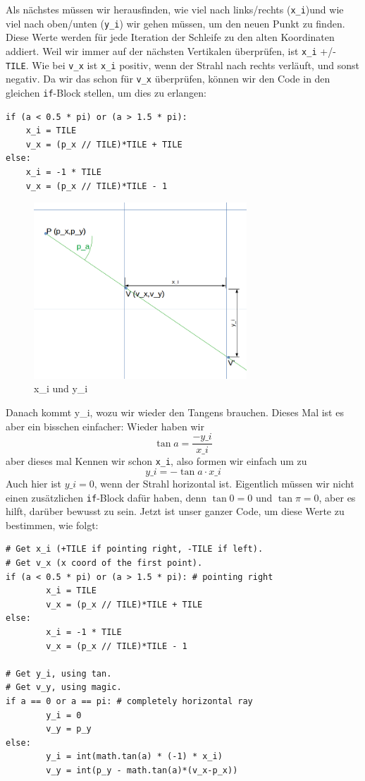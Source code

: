 \documentclass[a4paper,12pt]{report}
\begin{document}
Als nächstes müssen wir herausfinden, wie viel nach links/rechts (\texttt{x\_i})und wie viel nach oben/unten (\texttt{y\_i}) wir gehen müssen, um den neuen Punkt zu finden. Diese Werte werden für jede Iteration der Schleife zu den alten Koordinaten addiert. Weil wir immer auf der nächsten Vertikalen überprüfen, ist \texttt{x\_i} +/- \texttt{TILE}. Wie bei \texttt{v\_x} ist \texttt{x\_i} positiv, wenn der Strahl nach rechts verläuft, und sonst negativ. Da wir das schon für \texttt{v\_x} überprüfen, können wir den Code in den gleichen \texttt{if}-Block stellen, um dies zu erlangen:
\begin{Verbatim}[baselinestretch=1.0, xleftmargin=1cm]
if (a < 0.5 * pi) or (a > 1.5 * pi):
	x_i = TILE
	v_x = (p_x // TILE)*TILE + TILE
else:
	x_i = -1 * TILE
	v_x = (p_x // TILE)*TILE - 1
\end{Verbatim}

\begin{figure}[htbp] 
        \centering
        \includegraphics[width=8cm]{vcheck2.png} 
        \caption{x\_i und y\_i}
\end{figure}
Danach kommt y\_i, wozu wir wieder den Tangens brauchen. Dieses Mal ist es aber ein bisschen einfacher: Wieder haben wir $$\tan a = \frac{-y\_i}{x\_i}$$aber dieses mal Kennen wir schon \texttt{x\_i}, also formen wir einfach um zu $$y\_i = -\tan a \cdot x\_i$$
Auch hier ist $y\_i = 0$, wenn der Strahl horizontal ist. Eigentlich müssen wir nicht einen zusätzlichen \texttt{if}-Block dafür haben, denn $\tan 0 = 0$ und $\tan \pi = 0$, aber es hilft, darüber bewusst zu sein. Jetzt ist unser ganzer Code, um diese Werte zu bestimmen, wie folgt:
\begin{Verbatim}[baselinestretch=1.0, xleftmargin=1cm]
# Get x_i (+TILE if pointing right, -TILE if left).
# Get v_x (x coord of the first point).
if (a < 0.5 * pi) or (a > 1.5 * pi): # pointing right
        x_i = TILE
        v_x = (p_x // TILE)*TILE + TILE
else:
        x_i = -1 * TILE
        v_x = (p_x // TILE)*TILE - 1

# Get y_i, using tan.
# Get v_y, using magic.
if a == 0 or a == pi: # completely horizontal ray
        y_i = 0
        v_y = p_y
else:
        y_i = int(math.tan(a) * (-1) * x_i)
        v_y = int(p_y - math.tan(a)*(v_x-p_x))
\end{Verbatim}
\end{document}
